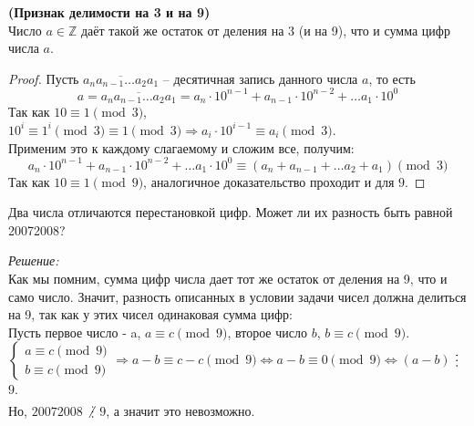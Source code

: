 \documentclass[11pt]{article}
\begin{document}
\begin{theorem}\textbf{(Признак делимости на 3 и на 9)}\\
	Число $a \in \mathbb{Z}$ даёт такой же остаток от деления на 3 (и на 9), что и сумма цифр числа $a$.
\end{theorem}

\begin{proof}

	Пусть $\overline{a_na_{n - 1}\ldots a_2 a_1}$ -- десятичная запись данного числа $a$, то есть
	\[a = \overline{a_na_{n - 1}\ldots a_2 a_1} = a_n \cdot 10^{n - 1} + a_{n - 1}\cdot 10^{n - 2} + \ldots a_1 \cdot 10^0 \]
	Так как $10 \equiv 1 \pmod 3$, $10^{i} \equiv 1^{i} \pmod 3 \equiv 1 \pmod 3 \Rightarrow a_i \cdot 10^{i - 1} \equiv a_i \pmod 3$.  \\
	Применим это к каждому слагаемому и сложим все, получим:\\
	\[a_n \cdot 10^{n - 1} + a_{n - 1}\cdot 10^{n - 2} + \ldots a_1 \cdot 10^0 \equiv (a_n + a_{n - 1} + \ldots  a_2 + a_1) \pmod 3\]
	Так как $10 \equiv 1 \pmod{9}$, аналогичное доказательство проходит и для $9$.

\end{proof}

\begin{example}
	
	Два числа отличаются перестановкой цифр. Может ли их разность быть равной 20072008?
	
\end{example}
\textit{Решение:}\\
Как мы помним, сумма цифр числа дает тот же остаток от деления на 9, что и само число. Значит, разность описанных в условии задачи чисел должна делиться на 9, так как у этих чисел одинаковая сумма цифр:\\
Пусть первое число - a, $a \equiv c \pmod 9$, второе число $b$, $b \equiv c \pmod 9$.\\
$\begin{cases}a \equiv c \pmod 9 \\ b \equiv c \pmod 9 \end{cases} \Longrightarrow a - b \equiv c -c \pmod 9 \Longleftrightarrow a - b \equiv 0 \pmod 9 \Longleftrightarrow (a - b)$ $\divisible$ $9$. \\
Но, $20072008$ $\not\divisible$ $9$, а значит это невозможно.\\
\end{document}
